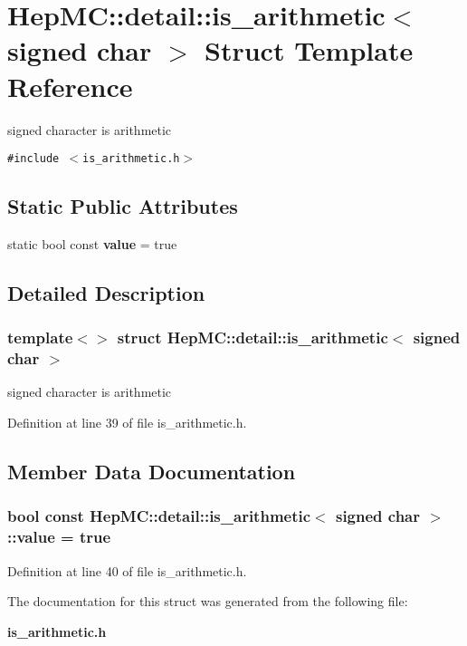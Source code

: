 \section{Hep\-MC::detail::is\_\-arithmetic$<$ signed char $>$ Struct Template Reference}
\label{structHepMC_1_1detail_1_1is__arithmetic_3_01signed_01char_01_4}
signed character is arithmetic  


{\tt \#include $<$is\_\-arithmetic.h$>$}

\subsection*{Static Public Attributes}
\begin{CompactItemize}
\item 
static bool const {\bf value} = true
\end{CompactItemize}


\subsection{Detailed Description}
\subsubsection*{template$<$$>$ struct Hep\-MC::detail::is\_\-arithmetic$<$ signed char $>$}

signed character is arithmetic 



Definition at line 39 of file is\_\-arithmetic.h.

\subsection{Member Data Documentation}
\subsubsection{\setlength{\rightskip}{0pt plus 5cm}bool const {\bf Hep\-MC::detail::is\_\-arithmetic}$<$ signed char $>$::{\bf value} = true\hspace{0.3cm}{\tt  [static]}}\label{structHepMC_1_1detail_1_1is__arithmetic_3_01signed_01char_01_4_724a5b700a3422dfdd35673e9e23d3ea}




Definition at line 40 of file is\_\-arithmetic.h.

The documentation for this struct was generated from the following file:\begin{CompactItemize}
\item 
{\bf is\_\-arithmetic.h}\end{CompactItemize}
